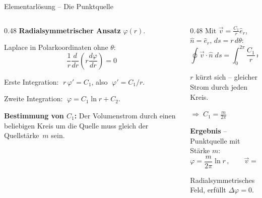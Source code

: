 \documentclass[aspectratio=169]{beamer}
\begin{document}
\begin{frame}{Elementarlösung -- Die Punktquelle}
\footnotesize

\begin{columns}[T]
\begin{column}{0.48\textwidth}
\textbf{Radialsymmetrischer Ansatz} $\varphi(r)$.

\smallskip
Laplace in Polarkoordinaten ohne $\theta$:
\vspace{-1mm}
\[
  \frac{1}{r}\frac{d}{dr}\!\left(r\frac{d\varphi}{dr}\right) = 0
\]

\vspace{-2mm}
Erste Integration: $\;r\,\varphi' = C_1$, also $\;\varphi' = C_1/r$.

Zweite Integration: $\;\varphi = C_1 \ln r + C_2$.

\medskip
\textbf{Bestimmung von $C_1$:} Der Volumenstrom durch
einen beliebigen Kreis um die Quelle muss gleich
der Quellstärke~$m$ sein.
\end{column}
\begin{column}{0.48\textwidth}
Mit $\vec{v}=\frac{C_1}{r}\hat{e}_r$,\; $\hat{n}=\hat{e}_r$,\; $ds=r\,d\theta$:
\vspace{-1mm}
\[
  \oint\vec{v}\!\cdot\!\hat{n}\;ds
  = \int_0^{2\pi}\!\frac{C_1}{r}\,r\,d\theta
  = 2\pi C_1 \stackrel{!}{=} m
\]

\vspace{-2mm}
$r$ kürzt sich -- gleicher Strom durch jeden Kreis.

$\Rightarrow\; C_1 = \tfrac{m}{2\pi}$

\medskip
\textbf{Ergebnis} -- Punktquelle mit Stärke $m$:
\vspace{-1mm}
\[
  \boxed{\varphi = \frac{m}{2\pi}\ln r\,,
  \qquad
  \vec{v} = \frac{m}{2\pi r}\,\hat{e}_r}
\]

\vspace{-2mm}
Radialsymmetrisches Feld, erfüllt $\Delta\varphi=0$.
\end{column}
\end{columns}

\end{frame}
\end{document}
